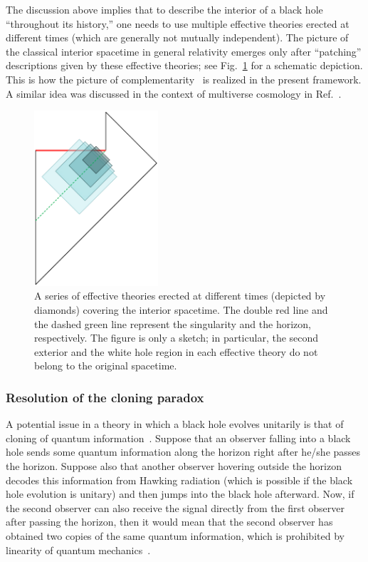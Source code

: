 \documentclass[12pt]{article}
\begin{document}
The discussion above implies that to describe the interior 
of a black hole ``throughout its history,'' one needs to use 
multiple effective theories erected at different times (which 
are generally not mutually independent).  The picture of the 
classical interior spacetime in general relativity emerges only 
after ``patching'' descriptions given by these effective theories; 
see Fig.~\ref{fig:global} for a schematic depiction.  This is how 
the picture of complementarity~\cite{Susskind:1993if} is realized 
in the present framework.  A similar idea was discussed in the 
context of multiverse cosmology in Ref.~\cite{Nomura:2011dt}.
%
\begin{figure}[t]
\begin{center}
  \includegraphics[height=6.5cm]{interior.eps}
\end{center}
\caption{A series of effective theories erected at different times 
 (depicted by diamonds) covering the interior spacetime.  The double 
 red line and the dashed green line represent the singularity and the 
 horizon, respectively.  The figure is only a sketch; in particular, 
 the second exterior and the white hole region in each effective 
 theory do not belong to the original spacetime.}
\label{fig:global}
\end{figure}
%

\subsubsection{Resolution of the cloning paradox}
\label{subsubsec:cloning}

A potential issue in a theory in which a black hole evolves unitarily 
is that of cloning of quantum information~\cite{JP,Susskind:1993mu}. 
Suppose that an observer falling into a black hole sends some 
quantum information along the horizon right after he/she passes 
the horizon.  Suppose also that another observer hovering outside 
the horizon decodes this information from Hawking radiation (which 
is possible if the black hole evolution is unitary) and then jumps 
into the black hole afterward.  Now, if the second observer can 
also receive the signal directly from the first observer after 
passing the horizon, then it would mean that the second observer 
has obtained two copies of the same quantum information, which is 
prohibited by linearity of quantum mechanics~\cite{Wootters:1982zz}.
\end{document}
